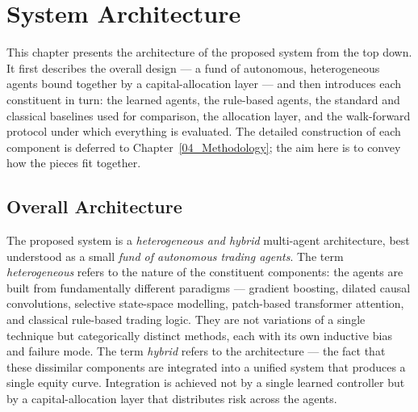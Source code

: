 \chapter{System Architecture}
\label{03_System_Architecture}

This chapter presents the architecture of the proposed system from the top down. It first describes the overall design --- a fund of autonomous, heterogeneous agents bound together by a capital-allocation layer --- and then introduces each constituent in turn: the learned agents, the rule-based agents, the standard and classical baselines used for comparison, the allocation layer, and the walk-forward protocol under which everything is evaluated. The detailed construction of each component is deferred to Chapter~\ref{04_Methodology}; the aim here is to convey how the pieces fit together.


\section{Overall Architecture}
\label{sec:overall_architecture}

The proposed system is a \textit{heterogeneous and hybrid} multi-agent architecture, best understood as a small \textit{fund of autonomous trading agents}. The term \textit{heterogeneous} refers to the nature of the constituent components: the agents are built from fundamentally different paradigms --- gradient boosting, dilated causal convolutions, selective state-space modelling, patch-based transformer attention, and classical rule-based trading logic. They are not variations of a single technique but categorically distinct methods, each with its own inductive bias and failure mode. The term \textit{hybrid} refers to the architecture --- the fact that these dissimilar components are integrated into a unified system that produces a single equity curve. Integration is achieved not by a single learned controller but by a capital-allocation layer that distributes risk across the agents.


